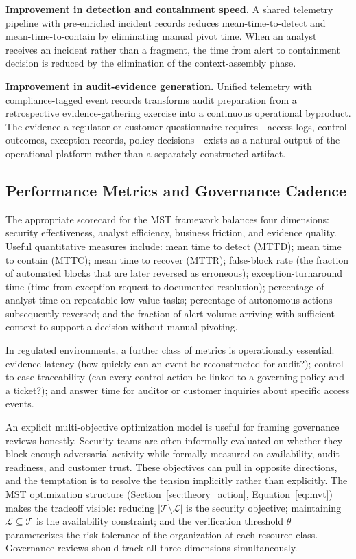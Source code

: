 \documentclass[acmlarge]{acmart}
\begin{document}
\textbf{Improvement in detection and containment speed.} A shared telemetry pipeline with
pre-enriched incident records reduces mean-time-to-detect and mean-time-to-contain by
eliminating manual pivot time. When an analyst receives an incident rather than a fragment,
the time from alert to containment decision is reduced by the elimination of the context-assembly
phase.

\textbf{Improvement in audit-evidence generation.} Unified telemetry with compliance-tagged
event records transforms audit preparation from a retrospective evidence-gathering exercise
into a continuous operational byproduct. The evidence a regulator or customer questionnaire
requires---access logs, control outcomes, exception records, policy decisions---exists as a
natural output of the operational platform rather than a separately constructed artifact.

\subsection{Performance Metrics and Governance Cadence}

The appropriate scorecard for the MST framework balances four dimensions: security
effectiveness, analyst efficiency, business friction, and evidence quality. Useful
quantitative measures include: mean time to detect (MTTD); mean time to contain (MTTC);
mean time to recover (MTTR); false-block rate (the fraction of automated blocks that
are later reversed as erroneous); exception-turnaround time (time from exception request
to documented resolution); percentage of analyst time on repeatable low-value tasks;
percentage of autonomous actions subsequently reversed; and the fraction of alert volume
arriving with sufficient context to support a decision without manual pivoting.

In regulated environments, a further class of metrics is operationally essential: evidence
latency (how quickly can an event be reconstructed for audit?); control-to-case
traceability (can every control action be linked to a governing policy and a ticket?);
and answer time for auditor or customer inquiries about specific access events.

An explicit multi-objective optimization model is useful for framing governance reviews
honestly. Security teams are often informally evaluated on whether they block enough
adversarial activity while formally measured on availability, audit readiness, and
customer trust. These objectives can pull in opposite directions, and the temptation is
to resolve the tension implicitly rather than explicitly. The MST optimization structure (Section~\ref{sec:theory_action}, Equation~\ref{eq:mvt}) makes the tradeoff visible: reducing $|\mathcal{T} \setminus \mathcal{L}|$
is the security objective; maintaining $\mathcal{L} \subseteq \mathcal{T}$ is the
availability constraint; and the verification threshold $\theta$ parameterizes the
risk tolerance of the organization at each resource class. Governance reviews should
track all three dimensions simultaneously.
\end{document}
